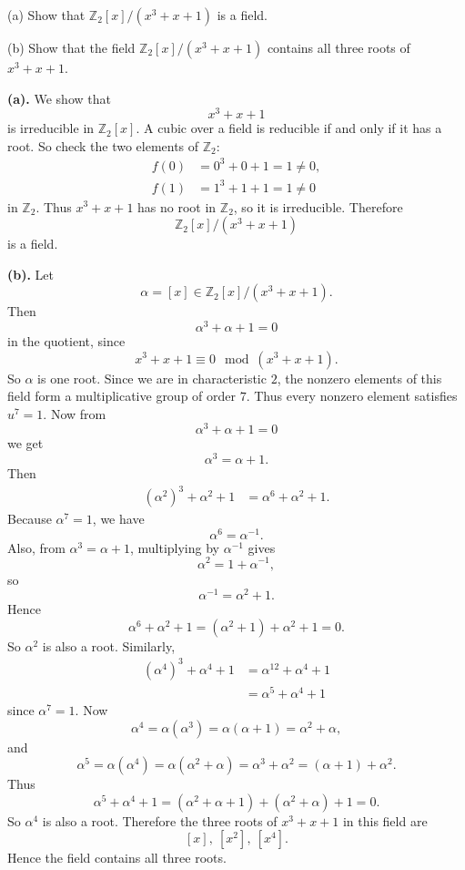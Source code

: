 \begin{problem}{
    (a) Show that $\mathbb{Z}_2[x]/(x^3+x+1)$ is a field.

    (b) Show that the field $\mathbb{Z}_2[x]/(x^3+x+1)$ contains all three roots of $x^3+x+1$.
}
    \textbf{(a).}
    We show that
    \[
        x^3+x+1
    \]
    is irreducible in $\mathbb{Z}_2[x]$.
    A cubic over a field is reducible if and only if it has a root.
    So check the two elements of $\mathbb{Z}_2$:
    \begin{align*}
        f(0) &= 0^3+0+1 = 1 \neq 0,\\
        f(1) &= 1^3+1+1 = 1 \neq 0
    \end{align*}
    in $\mathbb{Z}_2$.
    Thus $x^3+x+1$ has no root in $\mathbb{Z}_2$, so it is irreducible.
    Therefore
    \[
        \mathbb{Z}_2[x]/(x^3+x+1)
    \]
    is a field.

    \textbf{(b).}
    Let
    \[
        \alpha=[x]\in \mathbb{Z}_2[x]/(x^3+x+1).
    \]
    Then
    \[
        \alpha^3+\alpha+1=0
    \]
    in the quotient, since
    \[
        x^3+x+1\equiv 0 \mod (x^3+x+1).
    \]
    So $\alpha$ is one root.
    Since we are in characteristic $2$, the nonzero elements of this field form a multiplicative group of order $7$.
    Thus every nonzero element satisfies $u^7=1$.
    Now from
    \[
        \alpha^3+\alpha+1=0
    \]
    we get
    \[
        \alpha^3=\alpha+1.
    \]
    Then
    \begin{align*}
        (\alpha^2)^3+\alpha^2+1
    &=
        \alpha^6+\alpha^2+1.
    \end{align*}
    Because $\alpha^7=1$, we have
    \[
        \alpha^6=\alpha^{-1}.
    \]
    Also, from $\alpha^3=\alpha+1$, multiplying by $\alpha^{-1}$ gives
    \[
        \alpha^2=1+\alpha^{-1},
    \]
    so
    \[
        \alpha^{-1}=\alpha^2+1.
    \]
    Hence
    \[
        \alpha^6+\alpha^2+1 = (\alpha^2+1)+\alpha^2+1=0.
    \]
    So $\alpha^2$ is also a root.
    Similarly,
    \begin{align*}
        (\alpha^4)^3+\alpha^4+1
    &=
        \alpha^{12}+\alpha^4+1\\
        &=
        \alpha^5+\alpha^4+1
    \end{align*}
    since $\alpha^7=1$.
    Now
    \[
        \alpha^4=\alpha(\alpha^3)=\alpha(\alpha+1)=\alpha^2+\alpha,
    \]
    and
    \[
        \alpha^5=\alpha(\alpha^4)=\alpha(\alpha^2+\alpha)=\alpha^3+\alpha^2=(\alpha+1)+\alpha^2.
    \]
    Thus
    \[
        \alpha^5+\alpha^4+1=(\alpha^2+\alpha+1)+(\alpha^2+\alpha)+1=0.
    \]
    So $\alpha^4$ is also a root.
    Therefore the three roots of $x^3+x+1$ in this field are
    \[
        [x],\ [x^2],\ [x^4].
    \]
    Hence the field contains all three roots.
\end{problem}
